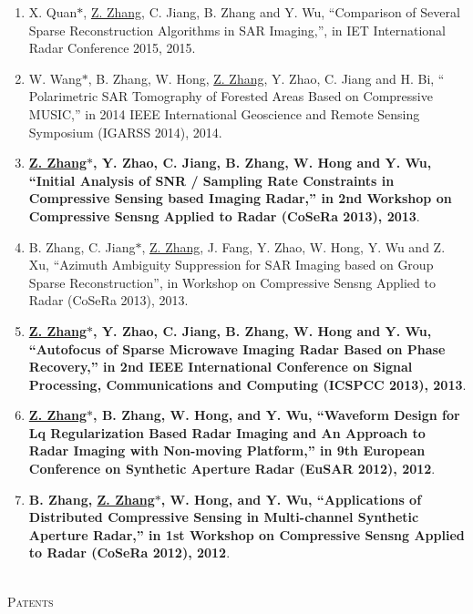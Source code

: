 \documentclass[paper=a4,fontsize=11pt]{scrartcl}
\begin{document}
\begin{enumerate}
\item X. Quan$\ast$, \underline{Z. Zhang}, C. Jiang, B. Zhang and Y. Wu, ``Comparison of Several Sparse Reconstruction Algorithms in SAR Imaging,'', in IET International Radar Conference 2015, 2015.

\item W. Wang$\ast$, B. Zhang, W. Hong, \underline{Z. Zhang}, Y. Zhao, C. Jiang and H. Bi, `` Polarimetric SAR Tomography of Forested Areas Based on Compressive MUSIC,'' in 2014 IEEE International Geoscience and Remote Sensing Symposium (IGARSS 2014), 2014.
	
\item \textbf{\underline{Z. Zhang$\ast$}, Y. Zhao, C. Jiang, B. Zhang, W. Hong and Y. Wu, ``Initial Analysis of SNR / Sampling Rate Constraints in Compressive Sensing based Imaging Radar,'' in 2nd Workshop on Compressive Sensng Applied to Radar (CoSeRa 2013), 2013}.

\item B. Zhang, C. Jiang$\ast$, \underline{Z. Zhang}, J. Fang, Y. Zhao, W. Hong, Y. Wu and Z. Xu, ``Azimuth Ambiguity Suppression for SAR Imaging based on Group Sparse Reconstruction'', in Workshop on Compressive Sensng Applied to Radar (CoSeRa 2013), 2013.
	
\item \textbf{\underline{Z. Zhang$\ast$}, Y. Zhao, C. Jiang, B. Zhang, W. Hong and Y. Wu, ``Autofocus of Sparse Microwave Imaging Radar Based on Phase Recovery,'' in 2nd IEEE International Conference on Signal Processing, Communications and Computing (ICSPCC 2013), 2013}.

\item \textbf{\underline{Z. Zhang$\ast$}, B. Zhang, W. Hong, and Y. Wu, ``Waveform Design for Lq Regularization Based Radar Imaging and An Approach to Radar Imaging with Non-moving Platform,'' in 9th European Conference on Synthetic Aperture Radar (EuSAR 2012), 2012}.

\item \textbf{B. Zhang, \underline{Z. Zhang$\ast$}, W. Hong, and Y. Wu, ``Applications of Distributed Compressive Sensing in Multi-channel Synthetic Aperture Radar,'' in 1st Workshop on Compressive Sensng Applied to Radar (CoSeRa 2012), 2012}.

\end{enumerate}

~\\
\textsc{Patents}
\end{document}
